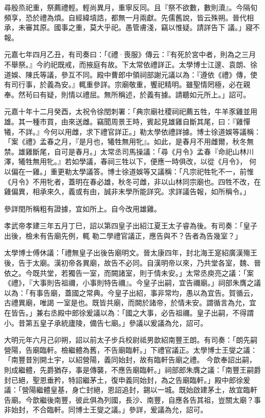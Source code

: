 \begin{pinyinscope}
 尋殷烝祀重，祭薦禮輕。輕尚異月，重寧反同。且『祭不欲數，數則瀆』。今隔旬頻享，恐於禮為煩。自經緯墳誥，都無一月兩獻。先儒舊說，皆云殊朔。晉代相承，未審其原。國事之重，莫大乎祀。愚管膚淺，竊以惟疑。請詳告下
 議。」寢不報。



 元嘉七年四月乙丑，有司奏曰：「《禮·喪服》傳云：『有死於宮中者，則為之三月不舉祭。』今礿祀既戒，而掖庭有故。下太常依禮詳正。太學博士江邃、袁朗、徐道娛、陳氏等議，參互不同。殿中曹郎中領祠部謝元議以為：『遵依《禮》傳，使有司行事，於義為安。』輒重參詳。宗廟敬重，饗祀精明。雖聖情罔極，必在親奉。然茍曰有疑，則情以禮屈。無所稱述，於義有據。請聽如元所上。」詔可。



 元嘉十年十二月癸酉，太祝令徐閏刺署：「典宗廟社稷祠祀薦五牲，牛羊豕雞並用雄。其一種市買，由來送雌。竊聞周景王時，賓起見雄雞自斷其尾，曰：『雞憚犧，不詳。』今何以用雌，求下禮官詳正。」勒太學依禮詳據。博士徐道娛等議稱：「案《禮》孟春之月，『是月也，犧牲無用牝』。如此，是春月不用雌爾，秋冬無禁。雄雞斷尾，自可是春月。」太常丞司馬操議：「尋《月令》孟春『命祀山林川澤，犧牲無用牝。』若如學議，春祠三牲以下，便應一時俱改，以從《月令》，
 何以偏在一雞。」重更勒太學議答。博士徐道娛等又議稱：「凡宗祀牲牝不一，前惟《月令》不用牝者，蓋明在春必雄，秋冬可雌，非以山林同宗廟也。四牲不改，在雞偏異，相承來久，義或有由，誠非末學所能詳究。求詳議告報，如所稱令。」



 參詳閏所稱粗有證據，宜如所上。自今改用雄雞。



 孝武帝孝建三年五月丁巳，詔以第四皇子出紹江夏王太子睿為後。有司奏：「皇子出後，檢未有告廟先例，輒
 勒二學禮官議正，應告與不？告者為告幾室？」



 太學博士傅休議：「禮無皇子出後告廟明文。晉太康四年，封北海王寔紹廣漢殤王後，告于太廟。漢初帝各異廟，故告不必同。自漢明帝以來，乃共堂各室，魏、晉依之。今既共堂，若獨告一室，而闕諸室，則于情未安。」太常丞庾亮之議：「案《禮》，『大事則告祖禰，小事則特告禰』。今皇子出嗣，宜告禰廟。」祠部朱膺之議以為：「有事告廟，蓋國之常典。今皇子出紹，事非常均，愚以為宜告。賀循云，古禮異廟，唯謁
 一室是也。既皆共廟，而闕於諸帝，於情未安。謂循言為允，宜在皆告。」兼右丞殿中郎徐爰議以為：「國之大事，必告祖禰。皇子出嗣，不得謂小。昔第五皇子承統廬陵，備告七廟。」參議以爰議為允，詔可。



 大明元年六月己卯朔，詔以前太子步兵校尉祗男歆紹南豐王朗。有司奏：「朗先嗣營陽，告廟臨軒。檢繼體為舊，不告廟臨軒。」下禮官議正。太學博士王燮之議：「南豐昔別開土宇，以紹營陽，義同始封，故有臨軒告廟之禮。
 今歆奉詔出嗣，則成繼體，先爵猶存，事是傳襲，不應告廟臨軒。」祠部郎朱膺之議：「南豐王嗣爵封已絕，聖恩垂矜，特詔繼茅土，復申義同始封，為之告廟臨軒。」殿中郎徐爰議：「營陽繼體皇基，身亡封絕，恩詔追封，錫以一城。既始啟建茅土，故宜臨軒告廟。今歆繼後南豐，彼此俱為列國，長沙、南豐，自應各告其祖，豈關太廟？事非始封，不合臨軒。同博士王燮之議。」參詳，爰議為允，詔可。




\end{pinyinscope}
